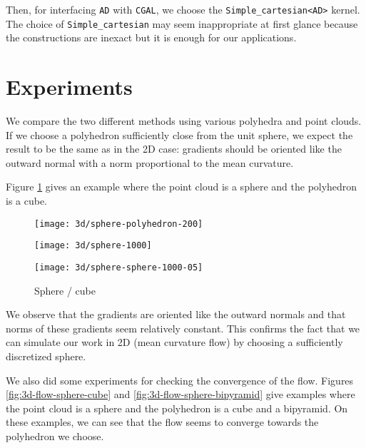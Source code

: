 Then, for interfacing \texttt{AD} with \texttt{CGAL}, we choose the
\texttt{Simple\_cartesian<AD>} kernel. The choice of \texttt{Simple\_cartesian}
may seem inappropriate at first glance because the constructions are inexact but
it is enough for our applications.


\section{Experiments}


We compare the two different methods using various polyhedra and point clouds.
If we choose a polyhedron sufficiently close from the unit sphere, we expect the
result to be the same as in the 2D case: gradients should be oriented like the
outward normal with a norm proportional to the mean curvature.

Figure \ref{fig:3d-mean-curvature-sphere-cube} gives an example where the point
cloud is a sphere and the polyhedron is a cube.

\begin{figure}[h]
    \centering
    \begin{minipage}{0.32\linewidth}
        \centering
        \texttt{[image: 3d/sphere-polyhedron-200]}
    \end{minipage}
    \begin{minipage}{0.32\linewidth}
        \centering
        \texttt{[image: 3d/sphere-1000]}
    \end{minipage}
    \begin{minipage}{0.32\linewidth}
        \centering
        \texttt{[image: 3d/sphere-sphere-1000-05]}
    \end{minipage}
    \caption{Sphere / cube}
    \label{fig:3d-mean-curvature-sphere-cube}
\end{figure}

We observe that the gradients are oriented like the outward normals and that
norms of these gradients seem relatively constant. This confirms the fact that
we can simulate our work in 2D (mean curvature flow) by choosing a sufficiently
discretized sphere.

We also did some experiments for checking the convergence of the flow. Figures
\ref{fig:3d-flow-sphere-cube} and \ref{fig:3d-flow-sphere-bipyramid} give
examples where the point cloud is a sphere and the polyhedron is a cube and a
bipyramid. On these examples, we can see that the flow seems to converge towards
the polyhedron we choose.


